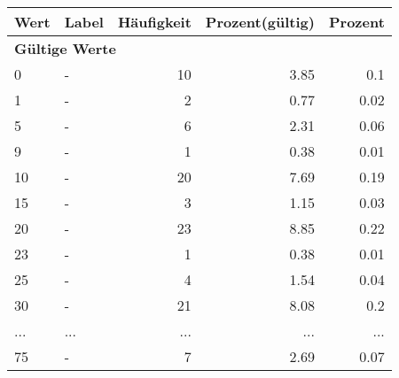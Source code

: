      \begin{longtable}{lXrrr}
     \toprule
     \textbf{Wert} & \textbf{Label} & \textbf{Häufigkeit} & \textbf{Prozent(gültig)} & \textbf{Prozent} \\
     \endhead
     \midrule
     \multicolumn{5}{l}{\textbf{Gültige Werte}}\\
        0 & \multicolumn{1}{X}{-} & %
          \num{10} &
          \num[round-mode=places,round-precision=2]{3,85} &
          \num[round-mode=places,round-precision=2]{0,1} \\
        1 & \multicolumn{1}{X}{-} & %
          \num{2} &
          \num[round-mode=places,round-precision=2]{0,77} &
          \num[round-mode=places,round-precision=2]{0,02} \\
        5 & \multicolumn{1}{X}{-} & %
          \num{6} &
          \num[round-mode=places,round-precision=2]{2,31} &
          \num[round-mode=places,round-precision=2]{0,06} \\
        9 & \multicolumn{1}{X}{-} & %
          \num{1} &
          \num[round-mode=places,round-precision=2]{0,38} &
          \num[round-mode=places,round-precision=2]{0,01} \\
        10 & \multicolumn{1}{X}{-} & %
          \num{20} &
          \num[round-mode=places,round-precision=2]{7,69} &
          \num[round-mode=places,round-precision=2]{0,19} \\
        15 & \multicolumn{1}{X}{-} & %
          \num{3} &
          \num[round-mode=places,round-precision=2]{1,15} &
          \num[round-mode=places,round-precision=2]{0,03} \\
        20 & \multicolumn{1}{X}{-} & %
          \num{23} &
          \num[round-mode=places,round-precision=2]{8,85} &
          \num[round-mode=places,round-precision=2]{0,22} \\
        23 & \multicolumn{1}{X}{-} & %
          \num{1} &
          \num[round-mode=places,round-precision=2]{0,38} &
          \num[round-mode=places,round-precision=2]{0,01} \\
        25 & \multicolumn{1}{X}{-} & %
          \num{4} &
          \num[round-mode=places,round-precision=2]{1,54} &
          \num[round-mode=places,round-precision=2]{0,04} \\
        30 & \multicolumn{1}{X}{-} & %
          \num{21} &
          \num[round-mode=places,round-precision=2]{8,08} &
          \num[round-mode=places,round-precision=2]{0,2} \\
       ... & ... & ... & ... & ... \\
        75 & \multicolumn{1}{X}{-} & %
          \num{7} &
          \num[round-mode=places,round-precision=2]{2,69} &
          \num[round-mode=places,round-precision=2]{0,07} \\


\end{longtable}
